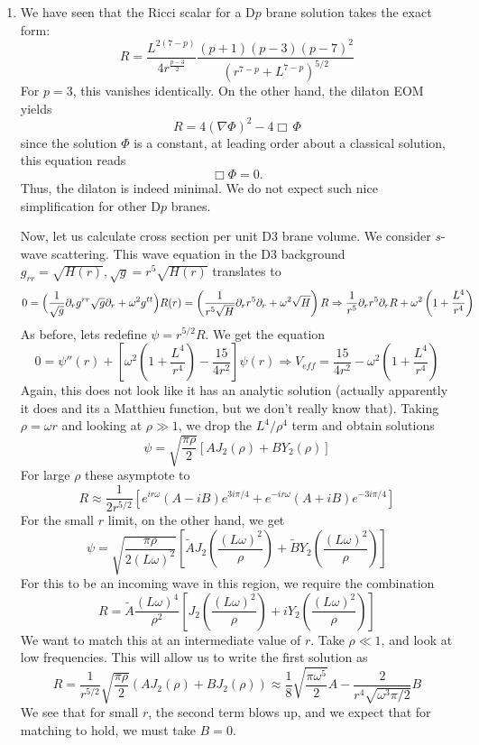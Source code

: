 \documentclass[11pt, class=article, crop=false]{standalone}
\begin{document}
\begin{enumerate}
	
	\item We have seen that the Ricci scalar for a D$p$ brane solution takes the exact form:
	\[
		R = \frac{L^{2(7-p)}}{4 r^{\frac{p-3}{2}}} \frac{(p+1) (p-3) (p-7)^2}{(r^{7-p} + L^{7-p})^{5/2}}
	\]
	For $p = 3$, this vanishes identically. On the other hand, the dilaton EOM yields
	\[
		R = 4 (\nabla \Phi)^2 - 4 \Box\, \Phi
	\]
	since the solution $\Phi$ is a constant, at leading order about a classical solution, this equation reads
	\[
		\Box \Phi = 0.
	\]
	Thus, the dilaton is indeed minimal. We do not expect such nice simplification for other D$p$ branes. 
	
	Now, let us calculate cross section per unit D3 brane volume.
	We consider $s$-wave scattering. This wave equation in the D3 background $g_{rr} = \sqrt{H(r)}, \sqrt g = r^5 \sqrt{H(r)}$ translates to
	\[
		0 = \Big(\frac{1}{\sqrt g} \partial_r g^{rr} \sqrt{g} \partial_r  + \omega^2 g^{tt} \Big) R(r)  = \left( \frac{1}{r^5 \sqrt{H}} \partial_r r^5 \partial_r + \omega^2 \sqrt{H}  \right) R \Rightarrow \frac{1}{r^5} \partial_r r^5 \partial_r R + \omega^2 \left(1 + \frac{L^4}{r^4} \right) 
	\]
	As before, lets redefine $\psi = r^{5/2} R$. We get the equation
	\[
		0 = \psi''(r) + \left[\omega^2 \left(1 + \frac{L^4}{r^4}\right)  - \frac{15}{4 r^2} \right] \psi(r) \Rightarrow V_{eff} = \frac{15}{4 r^2} - \omega^2 \left(1 + \frac{L^4}{r^4}\right)
	\]
	Again, this does not look like it has an analytic solution (actually apparently it does and its a Matthieu function, but we don't really know that). Taking $\rho = \omega r$ and looking at $\rho \gg 1$, we drop the $L^4/\rho^4$ term and obtain solutions
	\[
		\psi = \sqrt{\frac{\pi \rho}{2}} \left[A J_2 (\rho) + B Y_2(\rho)\right]
	\]
	For large $\rho$ these asymptote to
	\[
		R \approx \frac{1}{2 r^{5/2}} [e^{i r \omega} (A - i B ) e^{3 i \pi/4} + e^{-i r \omega} (A  + i B) e^{-3i \pi/4}]
	\]
	For the small $r$ limit, on the other hand, we get
	\[
		\psi = \sqrt{\frac{\pi \rho}{2  (L \omega)^2}} \left[\tilde A J_2 (\frac{(L \omega)^2}{\rho}) + \tilde B Y_2(\frac{(L \omega)^2}{\rho}) \right]
	\]
	For this to be an incoming wave in this region, we require the combination 
	\begin{equation} \label{eq:D3inc}
		R = \tilde A \frac{(L \omega)^4}{\rho^2} \left[ J_2 (\frac{(L \omega)^2}{\rho}) + i Y_2(\frac{(L \omega)^2}{\rho}) \right]
	\end{equation}
	We want to match this at an intermediate value of $r$. Take $\rho \ll 1$, and look at low frequencies. This will allow us to write the first solution as
	\[
		R = \frac{1}{r^{5/2}} \sqrt{\frac{\pi \rho}{2}} (A J_2(\rho) + B J_2(\rho)) \approx \frac18 \sqrt{\frac{\pi \omega^5}{2}} A - \frac{2}{r^4 \sqrt{\omega^3 \pi/2}} B
	\]
	We see that for small $r$, the second term blows up, and we expect that for matching to hold, we must take $B=0$. 
	

\end{enumerate}
\end{document}
